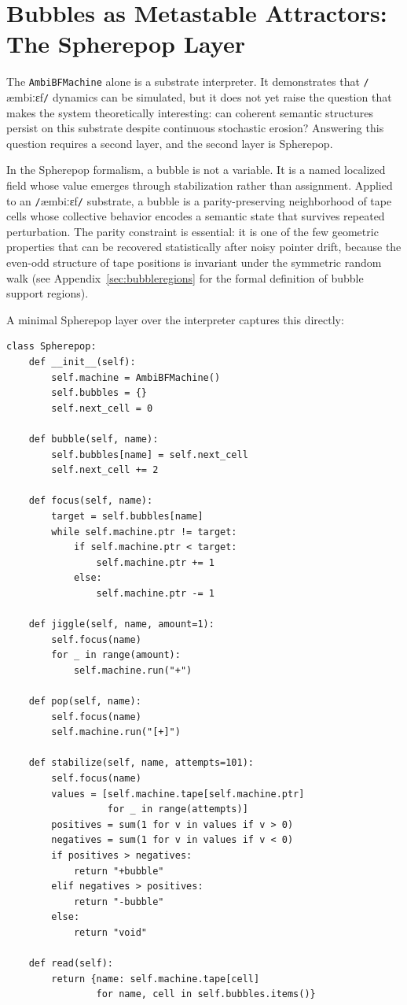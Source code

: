 \documentclass[11pt]{article}
\newcommand{\ambibf}{%
  \texttt{/}\textnormal{æmbiːɛf}\texttt{/}%
}
\begin{document}
\section{Bubbles as Metastable Attractors: The Spherepop Layer}

The \texttt{AmbiBFMachine} alone is a substrate interpreter. It demonstrates
that \ambibf{} dynamics can be simulated, but it does not yet raise the question
that makes the system theoretically interesting: can coherent semantic structures
persist on this substrate despite continuous stochastic erosion? Answering this
question requires a second layer, and the second layer is Spherepop.

In the Spherepop formalism, a bubble is not a variable. It is a named localized
field whose value emerges through stabilization rather than assignment. Applied
to an \ambibf{} substrate, a bubble is a parity-preserving neighborhood of tape
cells whose collective behavior encodes a semantic state that survives repeated
perturbation. The parity constraint is essential: it is one of the few geometric
properties that can be recovered statistically after noisy pointer drift, because
the even-odd structure of tape positions is invariant under the symmetric random
walk (see Appendix~\ref{sec:bubbleregions} for the formal definition of bubble
support regions).

A minimal Spherepop layer over the interpreter captures this directly:

\begin{lstlisting}
class Spherepop:
    def __init__(self):
        self.machine = AmbiBFMachine()
        self.bubbles = {}
        self.next_cell = 0

    def bubble(self, name):
        self.bubbles[name] = self.next_cell
        self.next_cell += 2

    def focus(self, name):
        target = self.bubbles[name]
        while self.machine.ptr != target:
            if self.machine.ptr < target:
                self.machine.ptr += 1
            else:
                self.machine.ptr -= 1

    def jiggle(self, name, amount=1):
        self.focus(name)
        for _ in range(amount):
            self.machine.run("+")

    def pop(self, name):
        self.focus(name)
        self.machine.run("[+]")

    def stabilize(self, name, attempts=101):
        self.focus(name)
        values = [self.machine.tape[self.machine.ptr]
                  for _ in range(attempts)]
        positives = sum(1 for v in values if v > 0)
        negatives = sum(1 for v in values if v < 0)
        if positives > negatives:
            return "+bubble"
        elif negatives > positives:
            return "-bubble"
        else:
            return "void"

    def read(self):
        return {name: self.machine.tape[cell]
                for name, cell in self.bubbles.items()}
\end{lstlisting}
\end{document}
